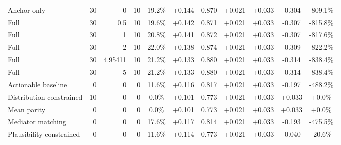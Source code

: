 \begin{table}[htbp]
\begin{tabular}{lrrrccccccc}
Anchor only & 30 & 0 & 10 & 19.2\% & +0.144 & 0.870 & +0.021 & +0.033 & -0.304 & -809.1\% \\
Full & 30 & 0.5 & 10 & 19.6\% & +0.142 & 0.871 & +0.021 & +0.033 & -0.307 & -815.8\% \\
Full & 30 & 1 & 10 & 20.8\% & +0.141 & 0.872 & +0.021 & +0.033 & -0.307 & -817.6\% \\
Full & 30 & 2 & 10 & 22.0\% & +0.138 & 0.874 & +0.021 & +0.033 & -0.309 & -822.2\% \\
Full & 30 & 4.95411 & 10 & 21.2\% & +0.133 & 0.880 & +0.021 & +0.033 & -0.314 & -838.4\% \\
Full & 30 & 5 & 10 & 21.2\% & +0.133 & 0.880 & +0.021 & +0.033 & -0.314 & -838.4\% \\
Actionable baseline & 0 & 0 & 0 & 11.6\% & +0.116 & 0.817 & +0.021 & +0.033 & -0.197 & -488.2\% \\
Distribution constrained & 10 & 0 & 0 & 0.0\% & +0.101 & 0.773 & +0.021 & +0.033 & +0.033 & +0.0\% \\
Mean parity & 0 & 0 & 0 & 0.0\% & +0.101 & 0.773 & +0.021 & +0.033 & +0.033 & +0.0\% \\
Mediator matching & 0 & 0 & 0 & 17.6\% & +0.117 & 0.814 & +0.021 & +0.033 & -0.193 & -475.5\% \\
Plausibility constrained & 0 & 0 & 0 & 11.6\% & +0.114 & 0.773 & +0.021 & +0.033 & -0.040 & -20.6\% \\
\bottomrule
\end{tabular}
\end{table}